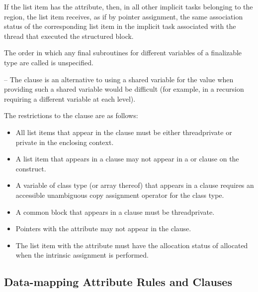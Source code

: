If the list item has the  attribute, then, in all other implicit tasks belonging to 
the  region, the list item receives, as if by pointer assignment, the same 
association status of the corresponding list item in the implicit task associated with the 
thread that executed the structured block.

The order in which any final subroutines for different variables of a finalizable type are called is unspecified.
\fortranspecificend

\notestart
\noteheader – The  clause is an alternative to using a shared variable for the 
value when providing such a shared variable would be difficult (for example, in a 
recursion requiring a different variable at each level). 
\noteend

\restrictions
The restrictions to the  clause are as follows:

\begin{itemize}
\item All list items that appear in the  clause must be either threadprivate 
or private in the enclosing context.

\item A list item that appears in a  clause may not appear in a  or
 clause on the  construct. 

\cppspecificstart
\item A variable of class type (or array thereof) that appears in a  clause 
requires an accessible unambiguous copy assignment operator for the class type.
\cppspecificend

\fortranspecificstart
\item A common block that appears in a  clause must be threadprivate. 

\item Pointers with the  attribute may not appear in the  
clause.
\item The list item with the  attribute must have the allocation status of allocated when the intrinsic assignment is performed. 
\fortranspecificend
\end{itemize}








\subsection{Data-mapping Attribute Rules and Clauses}
\label{subsec:Data-mapping Attribute Rules and Clauses}

